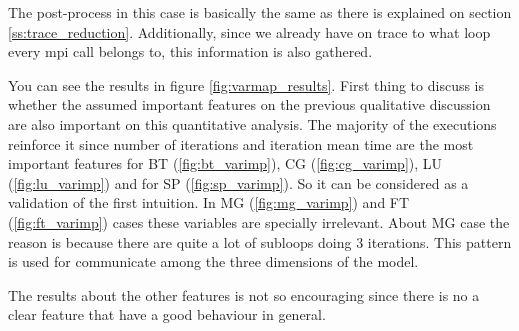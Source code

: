 The post-process in this case is basically the same as there is explained on
section \ref{ss:trace_reduction}. Additionally, since we already have on trace
to what loop every mpi call belongs to, this information is also gathered.

You can see the results in figure \ref{fig:varmap_results}. First thing to
discuss is whether the assumed important features on the previous qualitative
discussion are also important on this quantitative analysis. The majority of the
executions reinforce it since number of iterations and iteration mean time are
the most important features for BT (\ref{fig:bt_varimp}), CG
(\ref{fig:cg_varimp}), LU (\ref{fig:lu_varimp}) and for SP
(\ref{fig:sp_varimp}). So it can be considered as a validation of the first
intuition. In MG (\ref{fig:mg_varimp}) and FT (\ref{fig:ft_varimp}) cases 
these variables are specially irrelevant. About MG case the
reason is because there are quite a lot of subloops doing 3 iterations. This
pattern is used for communicate among the three dimensions of the model. 

The results about the other features is not so encouraging since there is no a
clear feature that have a good behaviour in general.


%
%

